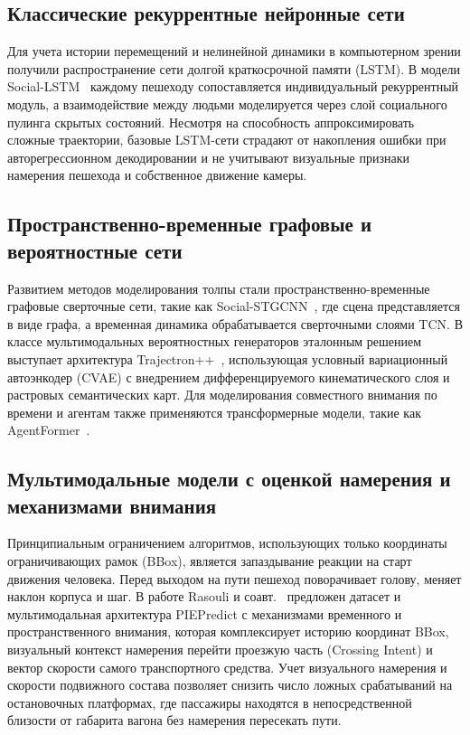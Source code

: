 \documentclass{misisarticle}
\begin{document}
\subsection{Классические рекуррентные нейронные сети}

Для учета истории перемещений и нелинейной динамики в компьютерном зрении получили распространение сети долгой краткосрочной памяти (LSTM). В модели Social-LSTM~\cite{alahi2016} каждому пешеходу сопоставляется индивидуальный рекуррентный модуль, а взаимодействие между людьми моделируется через слой социального пулинга скрытых состояний. Несмотря на способность аппроксимировать сложные траектории, базовые LSTM-сети страдают от накопления ошибки при авторегрессионном декодировании и не учитывают визуальные признаки намерения пешехода и собственное движение камеры.

\subsection{Пространственно-временные графовые и вероятностные сети}

Развитием методов моделирования толпы стали пространственно-временные графовые сверточные сети, такие как Social-STGCNN~\cite{mohamed2020}, где сцена представляется в виде графа, а временная динамика обрабатывается сверточными слоями TCN. В классе мультимодальных вероятностных генераторов эталонным решением выступает архитектура Trajectron++~\cite{salzmann2020}, использующая условный вариационный автоэнкодер (CVAE) с внедрением дифференцируемого кинематического слоя и растровых семантических карт. Для моделирования совместного внимания по времени и агентам также применяются трансформерные модели, такие как AgentFormer~\cite{yuan2021}.

\subsection{Мультимодальные модели с оценкой намерения и механизмами внимания}

Принципиальным ограничением алгоритмов, использующих только координаты ограничивающих рамок (BBox), является запаздывание реакции на старт движения человека. Перед выходом на пути пешеход поворачивает голову, меняет наклон корпуса и шаг. В работе Rasouli и соавт.~\cite{rasouli2019} предложен датасет и мультимодальная архитектура PIEPredict с механизмами временного и пространственного внимания, которая комплексирует историю координат BBox, визуальный контекст намерения перейти проезжую часть (Crossing Intent) и вектор скорости самого транспортного средства. Учет визуального намерения и скорости подвижного состава позволяет снизить число ложных срабатываний на остановочных платформах, где пассажиры находятся в непосредственной близости от габарита вагона без намерения пересекать пути.
\end{document}
